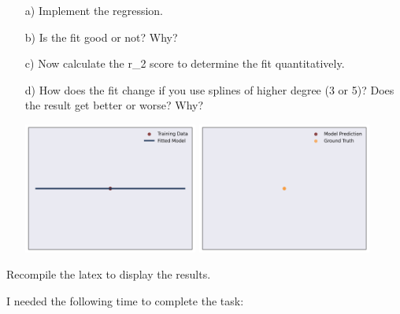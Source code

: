 \begin{enumerate}

\item[a)] Implement the regression.

\item[b)] Is the fit good or not? Why? 

\item[c)] Now calculate the r\_2 score to determine the fit quantitatively.

\item[d)] How does the fit change if you use splines of higher degree (3 or 5)? Does the result get better or worse? Why?

\includegraphics[width=0.45\textwidth]{source_code/overfit_spline_model.png}
\includegraphics[width=0.45\textwidth]{source_code/overfit_spline_testdata.png}

\end{enumerate}

Recompile the latex to display the results.

I needed the following time to complete the task:

